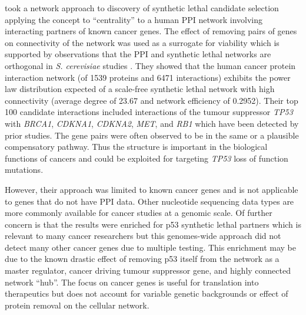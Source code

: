 \citet{Kranthi2013} took a network approach to discovery of \gls{synthetic lethal} candidate selection applying the concept to ``centrality'' to a human \gls{PPI} network involving interacting partners of known \glspl{cancer gene}. The effect of removing pairs of genes on connectivity of the network was used as a surrogate for viability which is supported by observations that the \gls{PPI} and \gls{synthetic lethal} networks are orthogonal in \textit{S. cerevisiae} studies \citep{Tong2004}. They showed that the human cancer protein interaction network (of 1539 proteins and 6471 interactions) exhibits the power law distribution expected of a \gls{scale-free} \gls{synthetic lethal} network with high connectivity (average  degree of 23.67 and network efficiency of 0.2952). Their top 100 candidate interactions included interactions of the \gls{tumour suppressor} \textit{TP53} with \textit{BRCA1}, \textit{CDKNA1}, \textit{CDKNA2}, \textit{MET}, and \textit{RB1} which have been detected by prior studies. The gene pairs were often observed to be in the same or a plausible compensatory pathway. Thus the  structure is important in the biological functions of cancers and could be exploited for targeting \textit{TP53} loss of function \glspl{mutation}. 

However, their approach was limited to known \glspl{cancer gene} and is not applicable to genes that do not have \gls{PPI} data. Other nucleotide sequencing data types are more commonly available for cancer studies at a \gls{genomic} scale. Of further concern is that the results were enriched for p53 \gls{synthetic lethal} partners which is relevant to many cancer researchers but this \glspl{genome}-wide approach did not detect many other \glspl{cancer gene} due to multiple testing. This enrichment may be due to the known drastic effect of removing p53 itself from the network as a master regulator, cancer driving \gls{tumour suppressor} gene, and highly connected network ``hub''. The focus on \glspl{cancer gene} is useful for translation into therapeutics but does not account for variable genetic backgrounds or effect of protein removal on the cellular network.  

